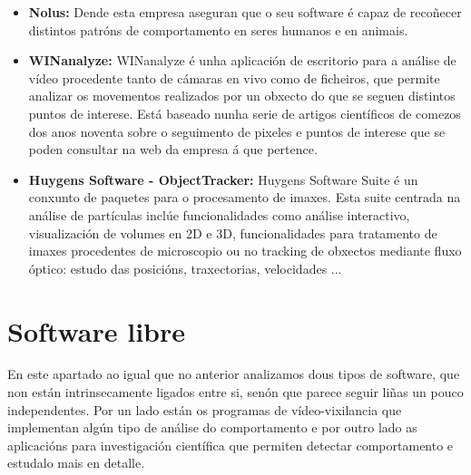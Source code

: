         \begin{itemize}
        \item  \textbf{Nolus:}\cite{nolus-human-behaviour}
            Dende esta empresa aseguran que o seu software é capaz de recoñecer distintos patróns de 
            comportamento en seres humanos e en animais.
        
        \item \textbf{WINanalyze:}\cite{WINanalyze-web-page}
            WINanalyze é unha aplicación de escritorio para a análise de vídeo procedente tanto de 
            cámaras en vivo como de ficheiros, que permite analizar os movementos realizados por un 
            obxecto do que se seguen distintos puntos de interese. Está baseado nunha serie de artigos
            científicos de comezos dos anos noventa sobre o seguimento de pixeles e puntos de interese
            que se poden consultar na web da empresa á que pertence\cite{mikromak-publications}.
        
        \item \textbf{Huygens Software - ObjectTracker:}\cite{Huygens-ObjectTracker}
            Huygens Software Suite é un conxunto de paquetes para o procesamento de imaxes.
            Esta suite centrada na análise de partículas inclúe funcionalidades como análise interactivo,
            visualización de volumes en 2D e 3D, funcionalidades para tratamento de imaxes procedentes
            de microscopio ou no tracking de obxectos mediante fluxo óptico: estudo das posicións,
            traxectorias, velocidades ...
            
        \end{itemize}

    \section{Software libre}
    \label{sec:video-vixilancia-libre}
        En este apartado ao igual que no anterior analizamos dous tipos de software, que non están
        intrinsecamente ligados entre si, senón que parece seguir liñas un pouco independentes. Por
        un lado están os programas de vídeo-vixilancia que implementan algún tipo de análise do
        comportamento e por outro lado as aplicacións para investigación científica que permiten 
        detectar comportamento e estudalo mais en detalle.
        
